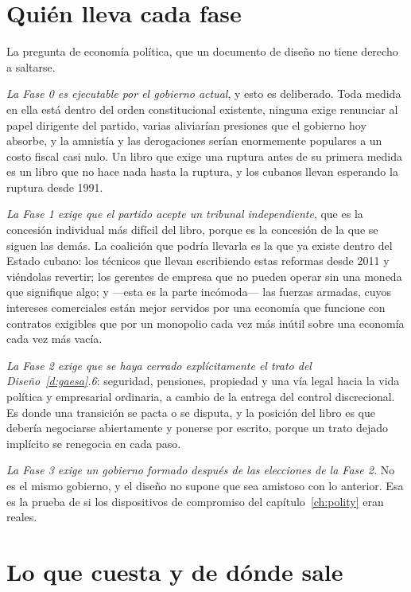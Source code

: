 \section{Quién lleva cada fase}

La pregunta de economía política, que un documento de diseño no tiene derecho a saltarse.

\emph{La Fase 0 es ejecutable por el gobierno actual}, y esto es deliberado. Toda medida en ella
está dentro del orden constitucional existente, ninguna exige renunciar al papel dirigente del
partido, varias aliviarían presiones que el gobierno hoy absorbe, y la amnistía y las derogaciones
serían enormemente populares a un costo fiscal casi nulo. Un libro que exige una ruptura antes de su
primera medida es un libro que no hace nada hasta la ruptura, y los cubanos llevan esperando la
ruptura desde 1991.

\emph{La Fase 1 exige que el partido acepte un tribunal independiente}, que es la concesión
individual más difícil del libro, porque es la concesión de la que se siguen las demás. La coalición
que podría llevarla es la que ya existe dentro del Estado cubano: los técnicos que llevan escribiendo
estas reformas desde 2011 y viéndolas revertir; los gerentes de empresa que no pueden operar sin una
moneda que signifique algo; y ---esta es la parte incómoda--- las fuerzas armadas, cuyos intereses
comerciales están mejor servidos por una economía que funcione con contratos exigibles que por un
monopolio cada vez más inútil sobre una economía cada vez más vacía.

\emph{La Fase 2 exige que se haya cerrado explícitamente el trato del Diseño~\ref{d:gaesa}.6}:
seguridad, pensiones, propiedad y una vía legal hacia la vida política y empresarial ordinaria, a
cambio de la entrega del control discrecional. Es donde una transición se pacta o se disputa, y la
posición del libro es que debería negociarse abiertamente y ponerse por escrito, porque un trato
dejado implícito se renegocia en cada paso.

\emph{La Fase 3 exige un gobierno formado después de las elecciones de la Fase 2.} No es el mismo
gobierno, y el diseño no supone que sea amistoso con lo anterior. Esa es la prueba de si los
dispositivos de compromiso del capítulo~\ref{ch:polity} eran reales.

\section{Lo que cuesta y de dónde sale}

